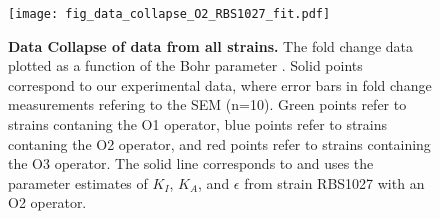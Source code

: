 \begin{figure}[h]
	\centering \texttt{[image: fig\_data\_collapse\_O2\_RBS1027\_fit.pdf]}
	\caption{{\bf Data Collapse of data from all strains.} The fold change data plotted as a function of the Bohr parameter \eref[eq10].  Solid points correspond to our experimental data, where error bars in fold change measurements refering to the SEM (n=10). Green points refer to strains contaning the O1 operator, blue points refer to strains contaning the O2 operator, and red points refer to strains containing the O3 operator. The solid line corresponds to \eref[eq10] and uses the parameter estimates of $K_I$, $K_A$, and $\epsilon$ from strain RBS1027 with an O2 operator.}
	\label{fig_result3}
\end{figure}
